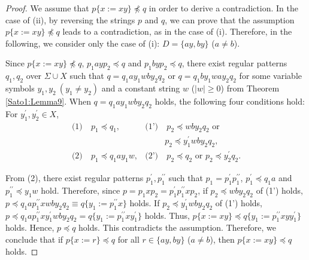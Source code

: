 \begin{proof}
We assume that $p \{ x := xy \} \not \preceq q$ in order to derive a contradiction.
In the case of \textrm{(ii)}, by reversing the strings $p$ and $q$, we can prove that the assumption {\color{red}$p \{ x := xy \} \not\preceq q$} leads to a contradiction, as in the case of \textrm{(i)}.
Therefore, in the following, we consider only the case of \textrm{(i)}: $D=\{ ay, by \}$ ($a \not= b$).

Since $p \{ x := xy \} \not \preceq q$, $p_{1}ayp_{2}\preceq q$ and $p_{1}byp_{2}\preceq q$, 
there exist regular patterns $q_{1},q_{2}$ {\color{red}over} $\Sigma\cup X$ such that $q=q_{1}ay_{1}wby_{2}q_{2}$ or $q=q_{1}by_{1}way_{2}q_{2}$ for some variable symbols $y_{1},y_{2}~(y_{1} \not= y_{2})$ and a constant string $w$ ($|w|\geq 0$) from Theorem \ref{Sato1:Lemma9}.
When $q=q_{1}ay_{1}wby_{2}q_{2}$ holds, the following four conditions hold: For $y_{1}^{\prime}, y_{2}^{\prime}\in X$,
\begin{align*}
\textrm{(1)} & ~p_{1} \preceq q_{1}, & \textrm{(1')} & ~p_{2} \preceq wby_{2}q_{2} \mbox{~or~}\\
& & & p_{2} \preceq y_{1}^{\prime}wby_{2}q_{2},\\
\textrm{(2)} & ~p_{1} \preceq q_{1}ay_{1}w, & \textrm{(2')} & ~p_{2} \preceq q_{2} \mbox{~or~}
p_{2} \preceq y_{2}^{\prime}q_{2}.
\end{align*}

From (2), there exist regular patterns $p_{1}^{\prime},p_{1}^{\prime\prime}$ such that $p_{1}=p_{1}^{\prime}p_{1}^{\prime\prime}$, $p_{1}^{\prime} \preceq q_{1}a$ and $p_{1}^{\prime\prime} \preceq y_{1}w$ hold.
Therefore, since $p=p_{1}xp_{2}=p_{1}^{\prime}p_{1}^{\prime\prime}xp_{2}$,
if $p_{2} \preceq wby_{2}q_{2}$ of (1') holds, 
$p\preceq q_{1}ap_{1}^{\prime\prime}xwby_{2}q_{2}\equiv q \{ y_{1} := p_{1}^{\prime\prime}x \}$ holds.
If $p_2\preceq y_{1}^{\prime}wby_{2}q_{2}$ of (1') holds, $p\preceq q_{1}ap_{1}^{\prime\prime}xy_{1}^{\prime}wby_{2}q_{2}=q \{ y_{1} := p_{1}^{\prime\prime}xy_{1}^{\prime} \}$ holds.
Thus, $p\{x := xy\} \preceq q \{ y_{1} := p_{1}^{\prime\prime}xyy_{1}^{\prime} \}$ holds.
Hence, $p \preceq q$ holds.
This contradicts the assumption.
Therefore, we conclude that if $p \{ x := r \} \preceq q$ for all $r \in \{ ay, by \}$ ($a \not= b$), then $p \{ x := xy \} \preceq q$ holds.
\end{proof}

